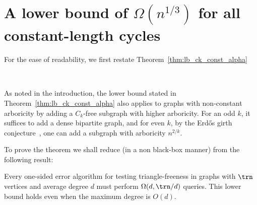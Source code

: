 \section{A lower bound of $\Omega(n^{1/3})$ for all constant-length cycles }\label{sec:Ck-lb}

For the ease of readability, we first restate Theorem~\ref{thm:lb_ck_const_alpha}

\medskip
{}~
\emph{\GenLB}


\medskip

As noted in the introduction, the lower bound stated in Theorem~\ref{thm:lb_ck_const_alpha} also applies to graphs with non-constant arboricity by adding a $C_k$-free subgraph with  higher arboricity. For an odd $k$, it suffices to add a dense bipartite graph, and for even $k$, by the Erd\H{o}s girth conjecture~\cite{E63}, one can add a subgraph with arboricity $n^{2/k}$.



To prove the theorem we shall reduce (in a non black-box manner) from the following result:

\begin{theorem}\label{thm:triangle_freeness}
    Every one-sided error algorithm for testing triangle-freeness in graphs with $\trn$ vertices and average degree $d$ must
perform $\Omega(d,\trn/d)$ queries. This lower bound holds even when %
the maximum degree is $O(d)$.
\end{theorem}

